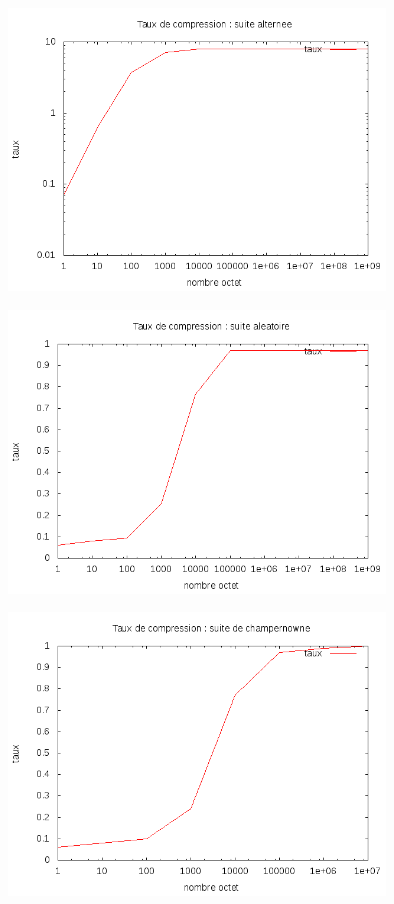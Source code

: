 \documentclass{report}
\begin{document}
\begin{center}
\includegraphics[width=10cm]{alternerH.png}
\end{center}

\begin{center}
\includegraphics[width=10cm]{aleaH.png}
\end{center}

\begin{center}
\includegraphics[width=10cm]{champH.png}
\end{center}
\end{document}
